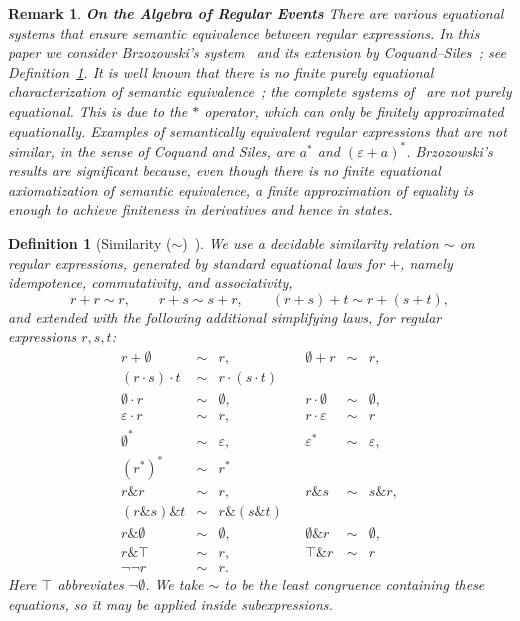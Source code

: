 \documentclass{article}
\newtheorem{definition}{Definition}[section]
\newtheorem{remark}{Remark}[section]
\begin{document}
 \begin{remark}{\bf On the Algebra of Regular Events}
There are various equational systems that ensure semantic equivalence between regular expressions. In this paper we consider Brzozowski's system~\cite{B62} and its extension by Coquand--Siles~\cite{CoquandRegexEquality}; see Definition~\ref{def:similarity}. It is well known that there is no finite purely equational characterization of semantic equivalence~\cite{Redko}; the complete systems of~\cite{Salomaa,Kozen} are not purely equational. This is due to the $\ast$ operator, which can only be finitely approximated equationally. Examples of semantically equivalent regular expressions that are not similar, in the sense of Coquand and Siles, are $a^*$ and $(\varepsilon+a)^*$. Brzozowski's results are significant because, even though there is no finite equational axiomatization of semantic equivalence, a finite approximation of equality is enough to achieve finiteness in derivatives and hence in states.
\end{remark}

\begin{definition}[Similarity ($\sim$)~\cite{CoquandRegexEquality}]
\label{def:similarity}
We use a decidable \emph{similarity} relation $\sim$ on regular expressions,
generated by standard equational laws for $+$, namely idempotence,
commutativity, and associativity,
\[
r+r \sim r,
\qquad
r+s \sim s+r,
\qquad
(r+s)+t \sim r+(s+t),
\]
and extended with the following additional simplifying laws, for regular
expressions $r,s,t$:
\[
\begin{array}{rclcrcl}
r+\emptyset &\sim& r, &&
\emptyset+r &\sim& r,\\[0.6ex]

(r\cdot s)\cdot t &\sim& r\cdot(s\cdot t)\\[0.4ex]
\emptyset\cdot r &\sim& \emptyset, &&
r\cdot\emptyset &\sim& \emptyset,\\[0.4ex]
\varepsilon\cdot r &\sim& r, &&
r\cdot\varepsilon &\sim& r\\[0.8ex]

\emptyset^* &\sim& \varepsilon, &&
\varepsilon^* &\sim& \varepsilon,\\[0.4ex]
(r^*)^* &\sim& r^*
\\[0.8ex]

r\&r &\sim& r, &&
r\&s &\sim& s\&r,\\[0.4ex]
(r\&s)\&t &\sim& r\&(s\&t)\\[0.4ex]
r\&\emptyset &\sim& \emptyset, &&
\emptyset\&r &\sim& \emptyset,\\[0.4ex]
r\&\top &\sim& r, &&
\top\&r &\sim& r\\[0.8ex]

\neg\neg r &\sim& r.
\end{array}
\]
Here $\top$ abbreviates $\neg\emptyset$. We take $\sim$ to be the least congruence containing these equations, so it may be applied inside subexpressions.
\end{definition}
\end{document}
